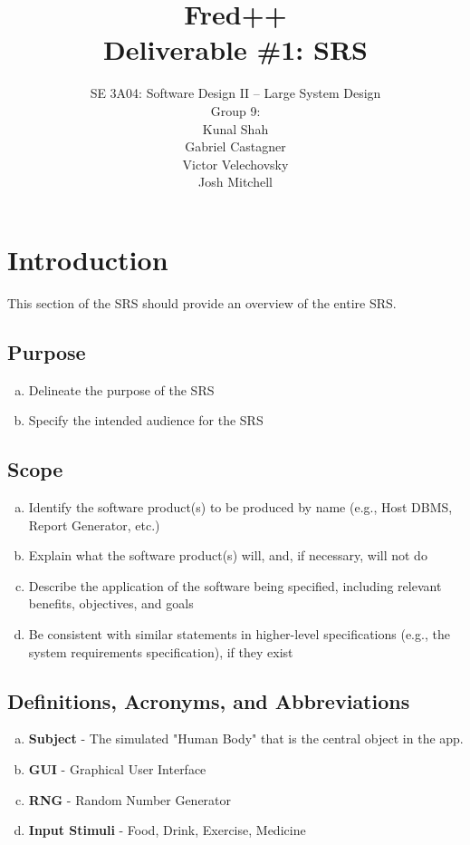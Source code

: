 \documentclass[]{article}
\title{Fred++\\Deliverable \#1: SRS}
\author{SE 3A04: Software Design II -- Large System Design\\Group 9:\\Kunal 
Shah\\Gabriel Castagner\\Victor Velechovsky\\Josh Mitchell}
\date{}
\begin{document}
\maketitle	

\section{Introduction}
\label{sec:introduction}

This section of the SRS should provide an overview of the entire SRS.

\subsection{Purpose}
\label{sub:purpose}
\begin{enumerate}[a)]
	\item Delineate the purpose of the SRS
	\item Specify the intended audience for the SRS
\end{enumerate}

\subsection{Scope}
\label{sub:scope}
\begin{enumerate}[a)]
	\item Identify the software product(s) to be produced by name (e.g., Host DBMS, Report Generator, etc.)
	\item Explain what the software product(s) will, and, if necessary, will not do
	\item Describe the application of the software being specified, including relevant benefits, objectives, and goals
	\item Be consistent with similar statements in higher-level specifications (e.g., the system requirements specification), if they exist
\end{enumerate}

\subsection{Definitions, Acronyms, and Abbreviations}
\label{sub:definitions_acronyms_and_abbreviations}
\begin{enumerate}[a)]
	\item \textbf{Subject} - The simulated "Human Body" that is the central object in the app.
    \item \textbf{GUI} - Graphical User Interface
    \item \textbf{RNG} - Random Number Generator
    \item \textbf{Input Stimuli} - Food, Drink, Exercise, Medicine
\end{enumerate}
\end{document}
